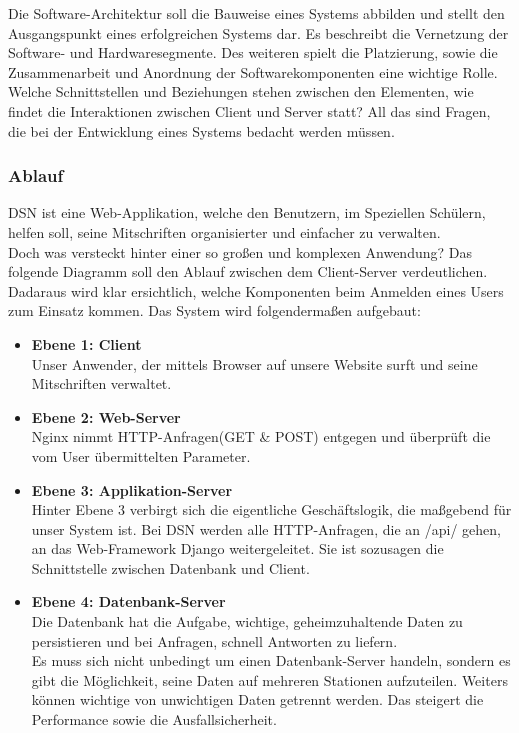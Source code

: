 
Die Software-Architektur soll die Bauweise eines Systems abbilden und stellt den Ausgangspunkt eines erfolgreichen Systems dar. Es beschreibt die Vernetzung der Software- und Hardwaresegmente. Des weiteren spielt die Platzierung, sowie die Zusammenarbeit und Anordnung der Softwarekomponenten eine wichtige Rolle.\\
Welche Schnittstellen und Beziehungen stehen zwischen den Elementen, wie findet die Interaktionen zwischen Client und Server statt? All das sind Fragen, die bei der Entwicklung eines Systems bedacht werden müssen. \cite{VERTEILTE_SYSTEME}

\subsubsection{Ablauf}
DSN ist eine Web-Applikation, welche den Benutzern, im Speziellen Schülern, helfen soll, seine Mitschriften organisierter und einfacher zu verwalten.\\
Doch was versteckt hinter einer so großen und komplexen Anwendung? Das folgende Diagramm soll den Ablauf zwischen dem Client-Server verdeutlichen. Dadaraus wird klar ersichtlich, welche Komponenten beim Anmelden eines Users zum Einsatz kommen. Das System wird folgendermaßen aufgebaut:
\begin{itemize}
\item \textbf{Ebene 1: Client}\\ Unser Anwender, der mittels Browser auf unsere Website surft und seine Mitschriften verwaltet.
\item \textbf{Ebene 2: Web-Server}\\ Nginx nimmt HTTP-Anfragen(GET \& POST) entgegen und überprüft die vom User übermittelten Parameter.
\item \textbf{Ebene 3: Applikation-Server}\\ Hinter Ebene 3 verbirgt sich die eigentliche Geschäftslogik, die maßgebend für unser System ist. Bei DSN werden alle HTTP-Anfragen, die an /api/ gehen, an das Web-Framework Django weitergeleitet. Sie ist sozusagen die Schnittstelle zwischen Datenbank und Client.
\newpage
\item \textbf{Ebene 4: Datenbank-Server}\\ Die Datenbank hat die Aufgabe, wichtige, geheimzuhaltende Daten zu persistieren und bei Anfragen, schnell Antworten zu liefern.\\
Es muss sich nicht unbedingt um einen Datenbank-Server handeln, sondern es gibt die Möglichkeit, seine Daten auf mehreren Stationen aufzuteilen. Weiters können wichtige von unwichtigen Daten getrennt werden. Das steigert die Performance sowie die Ausfallsicherheit.
\end{itemize}

